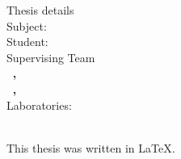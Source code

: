 \pagestyle{empty}
\hspace{10pt}
\begin{center}
\Large{Thesis details}\\[1cm]
{\large Subject:}
\textbf{\large \doctitle}\\[1cm]
\large {Student: \textbf{\nomme}}\\[1cm]
\large{Supervising Team}\\
\textbf{\suptitle \, \supname , \supuni}\\[1cm]
\textbf{\cosuptitle \, \cosupname , \cosupuni} \\[1cm]
Laboratories:\\
\lab \\[1cm]
\end{center}

\vspace{5em}

\begin{center}
  { \large
    This thesis was written in \LaTeX.\\
  }
\end{center}

